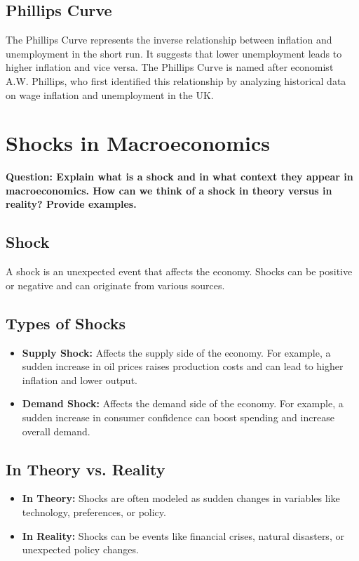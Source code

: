 \documentclass{article}
\begin{document}
\subsection{Phillips Curve}
The Phillips Curve represents the inverse relationship between inflation and unemployment in the short run. It suggests that lower unemployment leads to higher inflation and vice versa. The Phillips Curve is named after economist A.W. Phillips, who first identified this relationship by analyzing historical data on wage inflation and unemployment in the UK.

\section{Shocks in Macroeconomics}
\textbf{Question: Explain what is a shock and in what context they appear in macroeconomics. How can we think of a shock in theory versus in reality? Provide examples.}

\subsection{Shock}
A shock is an unexpected event that affects the economy. Shocks can be positive or negative and can originate from various sources.

\subsection{Types of Shocks}
\begin{itemize}
    \item \textbf{Supply Shock:} Affects the supply side of the economy. For example, a sudden increase in oil prices raises production costs and can lead to higher inflation and lower output.
    \item \textbf{Demand Shock:} Affects the demand side of the economy. For example, a sudden increase in consumer confidence can boost spending and increase overall demand.
\end{itemize}

\subsection{In Theory vs. Reality}
\begin{itemize}
    \item \textbf{In Theory:} Shocks are often modeled as sudden changes in variables like technology, preferences, or policy.
    \item \textbf{In Reality:} Shocks can be events like financial crises, natural disasters, or unexpected policy changes.
\end{itemize}
\end{document}
